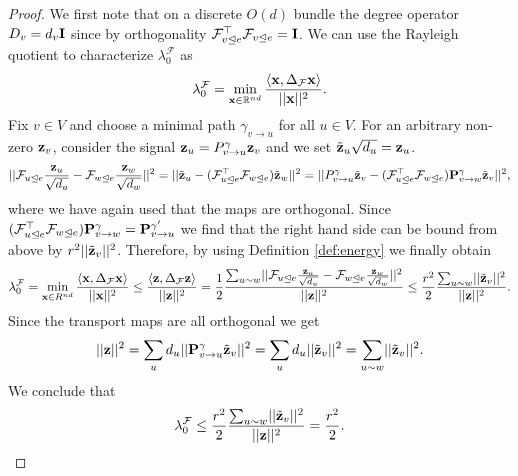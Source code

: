 \documentclass{article}
\def\vx{{\bf{x}}}
\def\vz{{\bf{z}}}
\def\mI{{\bf{I}}}
\def\mP{{\bf{P}}}
\newcommand{\R}{\mathbb{R}}
\newcommand{\tleq}{\trianglelefteq}
\begin{document}
\UpperBoundEigenv*
\begin{proof}
We first note that on a discrete $O(d)$ bundle the degree operator $D_{v} = d_{v} \mI$ since by orthogonality $\mathcal{F}_{v\tleq e}^\top \mathcal{F}_{v\tleq e} = \mI$.
We can use the Rayleigh quotient to characterize $\lambda_{0}^{\mathcal{F}}$ as 
\[
\lambda_{0}^{\mathcal{F}} = \min_{\vx\in \R^{nd}}\frac{\langle \vx, \Delta_{\mathcal{F}} \vx\rangle}{\lvert\lvert \vx \rvert\rvert^{2}}.
\]
\noindent Fix $v\in V$ and choose a minimal path $\gamma_{v\rightarrow u}$ for all $u\in V$. For an arbitrary non-zero $\vz_v$, consider the signal $ \vz_{u} = P^{\gamma}_{v\rightarrow u}\vz_{v}$
and we set $\tilde{\vz}_{u}\sqrt{d_{u}} = \vz_{u}$.
\[
\lvert \lvert \mathcal{F}_{u\tleq e}\frac{\vz_{u}}{\sqrt{d_{u}}} -  \mathcal{F}_{w\tleq e}\frac{\vz_{w}}{\sqrt{d_{w}}}\rvert\rvert^{2} = \lvert \lvert \tilde{\vz}_{u} -  (\mathcal{F}_{u\tleq e}^{\top}\mathcal{F}_{w\tleq e})\tilde{\vz}_{w}\rvert\rvert^{2} =
\lvert \lvert P^{\gamma}_{v\rightarrow u}\tilde{\vz}_{v} -  (\mathcal{F}_{u\tleq e}^{\top}\mathcal{F}_{w\tleq e})\mP^{\gamma}_{v\rightarrow w}\tilde{\vz}_{v}\rvert\rvert^{2},
\]
\noindent where we have again used that the maps are orthogonal. Since $(\mathcal{F}_{u\tleq e}^{\top}\mathcal{F}_{w\tleq e})\mP^{\gamma}_{v\rightarrow w} = \mP^{\gamma'}_{v\rightarrow u}$ we find that the right hand side can be bound from above by $r^{2}\lvert\lvert \tilde{\vz}_{v}\rvert\rvert^{2}$. Therefore, by using Definition \ref{def:energy} we finally obtain
\[
\lambda_{0}^{\mathcal{F}} = \min_{\vx\in R^{nd}}\frac{\langle \vx, \Delta_{\mathcal{F}} \vx\rangle}{\lvert\lvert \vx \rvert\rvert^{2}} \leq \frac{\langle \vz, \Delta_{\mathcal{F}} \vz\rangle}{\lvert\lvert \vz \rvert\rvert^{2}} = \frac{1}{2}\frac{\sum_{u\sim w}\lvert\lvert \mathcal{F}_{u\tleq e}\frac{\vz_{u}}{\sqrt{d_{u}}} -  \mathcal{F}_{w\tleq e}\frac{\vz_{w}}{\sqrt{d_{w}}}\rvert\rvert^{2}}{\lvert\lvert \vz \rvert\rvert^{2}} \leq \frac{r^{2}}{2}\frac{\sum_{u\sim w}\lvert\lvert \tilde{\vz}_{v}\rvert\rvert^{2}}{\lvert\lvert \vz\rvert\rvert^{2}}.
\]
\noindent Since the transport maps are all orthogonal we get
\[
\lvert\lvert \vz \rvert\rvert^{2} = \sum_{u} d_{u}\lvert\lvert \mP^{\gamma}_{v\rightarrow u}\tilde{\vz}_{v}\rvert\rvert^{2} =  \sum_{u} d_{u}\lvert\lvert \tilde{\vz}_{v}\rvert\rvert^{2} = \sum_{u\sim w}\lvert\lvert \tilde{\vz}_{v}\rvert\rvert^{2}. 
\]
\noindent We conclude that
\[
\lambda_{0}^{\mathcal{F}} \leq \frac{r^{2}}{2}\frac{\sum_{u\sim w}\lvert\lvert \tilde{\vz}_{v}\rvert\rvert^{2}}{\lvert\lvert \vz\rvert\rvert^{2}} = \frac{r^{2}}{2}.
\]
\end{proof}
\end{document}
